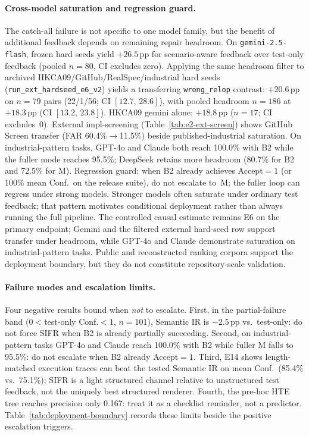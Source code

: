 \paragraph{Cross-model saturation and regression guard.}
The catch-all failure is not specific to one model family, but the benefit of
additional feedback depends on remaining repair headroom.
On \texttt{gemini-2.5-flash}, frozen hard seeds yield ${+}26.5$\,pp for
scenario-aware feedback over test-only feedback (pooled $n{=}80$, CI excludes
zero).
Applying the same headroom filter to archived HKCA09/GitHub/RealSpec/industrial
hard seeds (\texttt{run\_ext\_hardseed\_e6\_v2}) yields a transferring
\texttt{wrong\_relop} contrast: ${+}20.6$\,pp on $n{=}79$ pairs (22/1/56;
CI $[12.7,\,28.6]$), with pooled headroom $n{=}186$ at ${+}18.3$\,pp
(CI $[13.2,\,23.8]$).
HKCA09 gemini alone: ${+}18.8$\,pp ($n{=}17$; CI excludes~0).
External impl-screening (Table~\ref{tab:e2-ext-screen}) shows GitHub Screen
transfer (FAR 60.4\%$\rightarrow$11.5\%) beside published-industrial saturation.
On industrial-pattern tasks, GPT-4o and Claude both reach 100.0\%
with B2 while the fuller mode reaches 95.5\%; DeepSeek retains more headroom
(80.7\% for B2 and 72.5\% for M).
Regression guard: when B2 already achieves Accept${=}1$ (or 100\% mean Conf.\ on
the release suite), do not escalate to~M; the fuller loop can regress under
strong models.
Stronger models often saturate under ordinary test feedback; that pattern
motivates conditional deployment rather than always running the full pipeline.
The controlled causal estimate remains E6 on the primary endpoint; Gemini and
the filtered external hard-seed row support transfer under headroom, while
GPT-4o and Claude demonstrate saturation on industrial-pattern tasks.
Public and reconstructed ranking corpora support the deployment boundary, but
they do not constitute repository-scale validation.

\paragraph{Failure modes and escalation limits.}
Four negative results bound when \emph{not} to escalate.
First, in the partial-failure band ($0{<}$test-only Conf.${<}1$, $n{=}101$),
Semantic IR is ${-}2.5$\,pp vs.\ test-only: do not force SIFR when B2 is
already partially succeeding.
Second, on industrial-pattern tasks GPT-4o and Claude reach 100.0\% with B2
while fuller M falls to 95.5\%: do not escalate when B2 already Accept${=}1$.
Third, E14 shows length-matched execution traces can beat the tested Semantic
IR on mean Conf.\ (85.4\% vs.\ 75.1\%); SIFR is a light structured channel
relative to unstructured test feedback, not the uniquely best structured
renderer.
Fourth, the pre-hoc HTE tree reaches precision only 0.167: treat it as a
checklist reminder, not a predictor.
Table~\ref{tab:deployment-boundary} records these limits beside the positive
escalation triggers.

